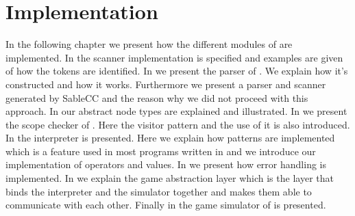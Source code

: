 \chapter{Implementation}
\label{chap:implementation}

In the following chapter we present how the different modules of \productname{} are implemented. In  the scanner implementation is specified and examples are given of how the tokens are identified. In  we present the parser of
\productname{}. We explain how it's constructed and how it works. Furthermore we present a parser and scanner generated by SableCC and the reason why we did not proceed with this approach. In  our abstract node types are explained and illustrated. In  we present the scope checker of \productname{}. Here the visitor pattern and the use of it is also introduced. In  the interpreter is presented. Here we explain how patterns are implemented which is a feature used in most programs written in \productname{} and we introduce our implementation of operators and values. In  we present how error handling is implemented. In  we explain the game abstraction layer which is the layer that binds the interpreter and the simulator together and makes them able to communicate with each other. Finally in  the game simulator of \productname{} is presented.    











